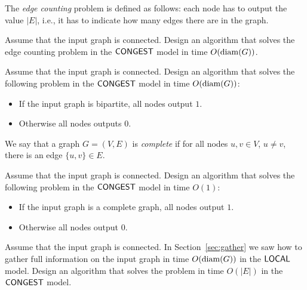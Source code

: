 \begin{ex}
    The \emph{edge counting} problem is defined as follows: each node has to output the value $|E|$, i.e., it has to indicate how many edges there are in the graph.

    Assume that the input graph is connected. Design an algorithm that solves the edge counting problem in the $\textup{\sffamily CONGEST}$ model in time $O(\operatorname{diam}(G))$.
\end{ex}

\begin{ex}
    Assume that the input graph is connected. Design an algorithm that solves the following problem in the $\textup{\sffamily CONGEST}$ model in time $O(\operatorname{diam}(G))$:
    \begin{itemize}[noitemsep]
        \item If the input graph is bipartite, all nodes output $1$.
        \item Otherwise all nodes outputs $0$.
    \end{itemize}
\end{ex}

\begin{ex}
    We say that a graph $G = (V,E)$ is \emph{complete} if for all nodes $u, v \in V$, $u \ne v$, there is an edge $\{u,v\} \in E$.

    Assume that the input graph is connected. Design an algorithm that solves the following problem in the $\textup{\sffamily CONGEST}$ model in time $O(1)$:
    \begin{itemize}[noitemsep]
        \item If the input graph is a complete graph, all nodes output $1$.
        \item Otherwise all nodes output $0$.
    \end{itemize}
\end{ex}

\begin{ex}[gathering]
    Assume that the input graph is connected. In Section~\ref{sec:gather} we saw how to gather full information on the input graph in time $O(\operatorname{diam}(G))$ in the $\textup{\sffamily LOCAL}$ model. Design an algorithm that solves the problem in time $O(|E|)$ in the $\textup{\sffamily CONGEST}$ model.
\end{ex}

